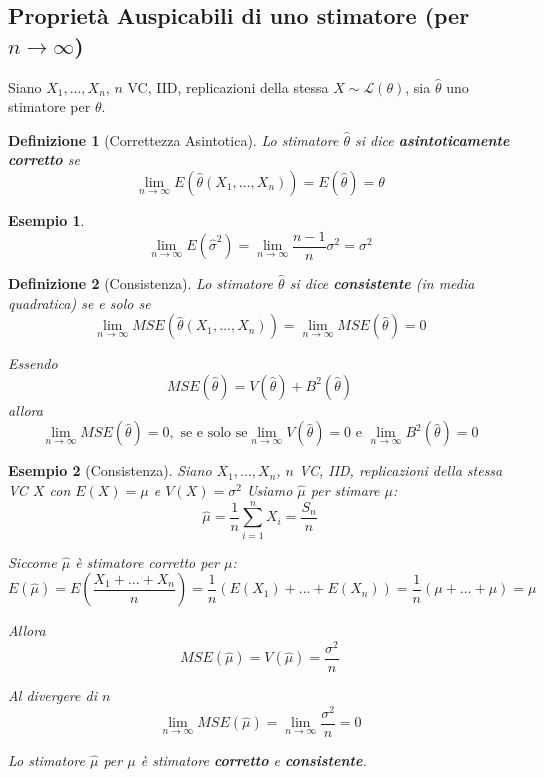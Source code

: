 \documentclass[
  11pt,
]{book}
\theoremstyle{mytheoremstyle}
\theoremstyle{mydefstyle}
\newtheorem{definition}{Definizione}[section]
\newtheorem{example}{{Esempio}}[section]
\begin{document}
\subsection{\texorpdfstring{Proprietà Auspicabili di uno stimatore (per \(n\to\infty\))}{Proprietà Auspicabili di uno stimatore (per n\textbackslash to\textbackslash infty)}}\label{proprietuxe0-auspicabili-di-uno-stimatore-per-ntoinfty}

Siano \(X_1,...,X_n\), \(n\) VC, IID, replicazioni della stessa \(X\sim\mathscr{L}(\theta)\), sia \(\hat\theta\) uno stimatore per \(\theta\).

\begin{info}

\begin{definition}[Correttezza Asintotica]
Lo stimatore \(\hat\theta\) si dice \textbf{asintoticamente corretto} se
\[\lim_{n\to\infty}E(\hat\theta(X_1,...,X_n))=E(\hat\theta)=\theta\]
\end{definition}

\end{info}

\begin{example}
\[\lim_{n\to\infty}E(\hat\sigma^2)=\lim_{n\to\infty}\frac{n-1}n\sigma^2=\sigma^2\]
\end{example}

\begin{info}

\begin{definition}[Consistenza]
Lo stimatore \(\hat\theta\) si dice \textbf{consistente} (in media quadratica) se e solo se
\[\lim_{n\to\infty}MSE(\hat\theta(X_1,...,X_n))=\lim_{n\to\infty}MSE(\hat\theta)=0\]

Essendo
\[MSE(\hat\theta)=V(\hat\theta)+B^2(\hat\theta)\]
allora
\[\lim_{n\to\infty} MSE(\hat\theta)=0, \text{ se e solo se} \lim_{n\to\infty} V(\hat\theta)=0 \text{ e } \lim_{n\to\infty} B^2(\hat\theta)=0\]
\end{definition}

\end{info}

\begin{example}[Consistenza]
Siano \(X_1,...,X_n\), \(n\) VC, IID, replicazioni della stessa VC \(X\) con \(E(X)=\mu\) e \(V(X)=\sigma^2\)
Usiamo \(\hat \mu\) per stimare \(\mu\):
\[\hat \mu=\frac 1 n \sum_{i=1}^n X_i=\frac {S_n}n\]

Siccome \(\hat \mu\) è stimatore corretto per \(\mu\):
\[E(\hat \mu)=E\left(\frac{X_1+...+X_n}{n}\right)=\frac 1 n(E(X_1)+...+E(X_n))=\frac 1 n (\mu+...+\mu)=\mu\]

Allora
\[MSE(\hat \mu)=V(\hat \mu)=\frac {\sigma^2}n\]

Al divergere di \(n\)
\[\lim_{n\to \infty}MSE(\hat \mu)=\lim_{n\to\infty}\frac{\sigma^2}n=0\]

Lo stimatore \(\hat \mu\) per \(\mu\) è stimatore \textbf{corretto} e \textbf{consistente}.
\end{example}
\end{document}
